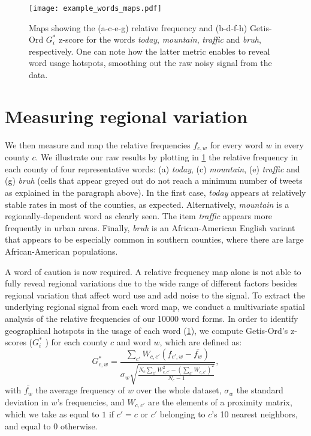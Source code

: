 \documentclass[../thesis.tex]{subfiles}
\begin{document}
\begin{figure}[hpt!]
\centering
  \texttt{[image: example\_words\_maps.pdf]}
  \caption{Maps showing the (a-c-e-g) relative frequency and (b-d-f-h) Getis-Ord
  $G_i^*$ z-score for the words \textit{today}, \textit{mountain}, \textit{traffic} and
  \textit{bruh}, respectively. One can note how the latter metric enables to reveal word
  usage hotspots, smoothing out the raw noisy signal from the data.}
  \label{fig:example_words_maps}
\end{figure}


\section{Measuring regional variation}
We then measure and map the relative frequencies $f_{c, w}$ for every word $w$ in every
county $c$. We illustrate our raw results by plotting in \cref{fig:example_words_maps}
the relative frequency in each county of four representative words: (a) \textit{today},
(c) \textit{mountain}, (e) \textit{traffic} and (g) \textit{bruh} (cells that appear
greyed out do not reach a minimum number of tweets as explained in the paragraph above).
In the first case, \textit{today} appears at relatively stable rates in most of the
counties, as expected. Alternatively, \textit{mountain} is a regionally-dependent word
as clearly seen. The item \textit{traffic} appears more frequently in urban areas.
Finally, \textit{bruh} is an African-American English variant that appears to be
especially common in southern counties, where there are large African-American
populations.

A word of caution is now required. A relative frequency map alone is not able to fully
reveal regional variations due to the wide range of different factors besides regional
variation that affect word use and add noise to the signal. To extract the underlying
regional signal from each word map, we conduct a multivariate spatial analysis
\cite{GrieveStatisticalMethod2011,GrieveRegionalVariation2016} of the relative
frequencies of our \SI{10000}{} word forms. In order to identify geographical hotspots
in the usage of each word (\cref{fig:example_words_maps}), we compute Getis-Ord's
z-scores ($G_i^*$ \cite{OrdLocalSpatial1995}) for each county $c$ and word $w$, which
are defined as:
\begin{equation}
\label{eq:Gi_star}
  G_{c, w}^* = \frac{
      \sum_{c'} W_{c, c'} (f_{c', w} - \bar{f_w})
    }{
      \sigma_w \sqrt{\frac{
        N_c \sum_{c'} W_{c, c'}^2
          - \left( \sum_{c'} W_{c, c'} \right)^2
        }{
          N_c - 1
        }
      }
    },
\end{equation}
with $\bar{f_w}$ the average frequency of $w$ over the whole dataset, $\sigma_w$ the
standard deviation in $w$'s frequencies, and $W_{c, c'}$ are the elements of a proximity
matrix, which we take as equal to $1$ if $c' = c$ or $c'$ belonging to $c$'s 10 nearest
neighbors, and equal to $0$ otherwise.
\end{document}
